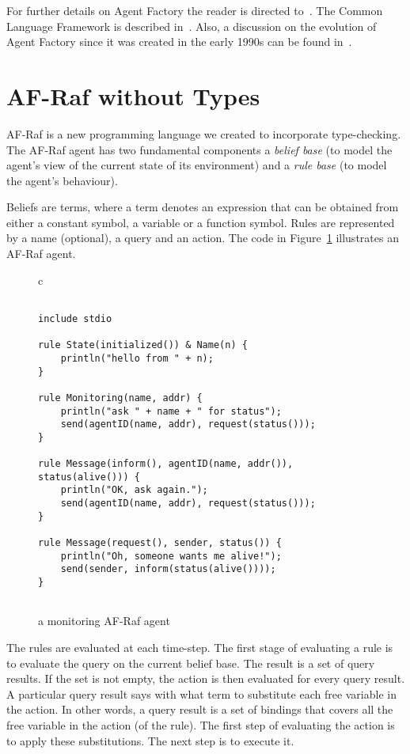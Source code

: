 \documentclass[preprint]{sigplanconf} %
\begin{document}
For further details on Agent Factory the reader is directed
to~\cite{collier2009modeling}. The Common Language Framework is described
in~\cite{russell2011af}. Also, a discussion on the evolution of Agent Factory since it
was created in the early 1990s can be found in~\cite{muldoon2009towards}.

\section{AF-Raf without Types} \label{sec:af-raf} %

AF-Raf is a new programming language we created to incorporate
type-checking. The AF-Raf agent has two fundamental components a
\textit{belief base} (to model the agent's view of the current state of its
environment) and a \textit{rule base} (to model the agent's behaviour).

Beliefs are terms, where a term denotes an expression that can be obtained
from either a constant symbol, a variable or a function symbol. Rules are
represented by a name (optional), a query and an action.  The code in
Figure~\ref{fig:AF-Raf} illustrates an AF-Raf agent.


\begin{figure}\footnotesize %
\begin{center}
\begin{tabular}{c}
\begin{lstlisting}[style=hs]

include stdio

rule State(initialized()) & Name(n) {
    println("hello from " + n);
}
  
rule Monitoring(name, addr) {
    println("ask " + name + " for status");
    send(agentID(name, addr), request(status()));
}

rule Message(inform(), agentID(name, addr()), status(alive())) {
    println("OK, ask again.");
    send(agentID(name, addr), request(status())); 
}
    
rule Message(request(), sender, status()) {
    println("Oh, someone wants me alive!");
    send(sender, inform(status(alive())));
}


\end{lstlisting}
\end{tabular}
\end{center}
\caption{a monitoring AF-Raf agent}
\label{fig:AF-Raf}
\end{figure} %

The rules are evaluated at each time-step. The first stage of evaluating a
rule is to evaluate the query on the current belief base. The result is a
set of query results. If the set is not empty, the action is then evaluated
for every query result. A particular query result says with what term to
substitute each free variable in the action. In other words, a query result
is a set of bindings that covers all the free variable in the action (of
the rule). The first step of evaluating the action is to apply these
substitutions. The next step is to execute it. 
\end{document}
